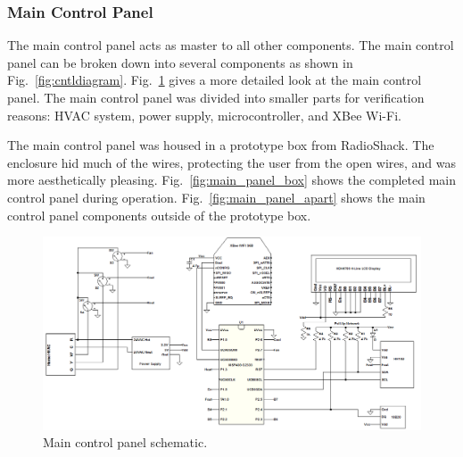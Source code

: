 \subsubsection{Main Control Panel}
The main control panel acts as master to all other components. The main control panel can be broken down into several components as shown in Fig.~\ref{fig:cntldiagram}. Fig.~\ref{fig:main_cntl_schematic} gives a more detailed look at the main control panel.  The main control panel was divided into smaller parts for verification reasons: HVAC system, power supply, microcontroller, and XBee Wi-Fi.

The main control panel was housed in a prototype box from RadioShack.  The enclosure hid much of the wires, protecting the user from the open wires, and was more aesthetically pleasing. Fig.~\ref{fig:main_panel_box} shows the completed main control panel during operation.  Fig.~\ref{fig:main_panel_apart} shows the main control panel components outside of the prototype box.
\begin{figure}
\centering
\includegraphics[width=.99\textwidth]{main_cntl_schematic.png}
\caption{Main control panel schematic.}
\label{fig:main_cntl_schematic}
\end{figure}

